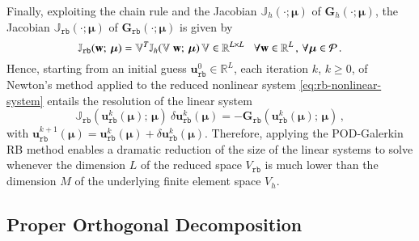 \documentclass{elsarticle}
\theoremstyle{theorem}
\theoremstyle{definition}
\theoremstyle{remark}
\theoremstyle{proposition}
\numberwithin{figure}{section}
\newcommand{\bg}[1]{\boldsymbol{#1}}
\begin{document}
		Finally, exploiting the chain rule and the Jacobian $\mathbb{J}_h(\cdot; \bg{\mu})$ of $\mathbf{G}_h(\cdot; \bg{\mu})$, the Jacobian $\mathbb{J}_{\texttt{rb}}(\cdot; \bg{\mu})$ of $\mathbf{G}_{\texttt{rb}}(\cdot; \bg{\mu})$ is given by
		\begin{equation}
			\label{eq:rb-nonlinear-system-jacobian}
			\mathbb{J}_{\texttt{rb}}(\mathbf{w}; \, \bg{\mu}) = \mathbb{V}^T \mathbb{J}_h(\mathbb{V} ~ \mathbf{w}; \, \bg{\mu}) \, \mathbb{V} \in \mathbb{R}^{L \times L} \hspace*{0.3cm} \forall \mathbf{w} \in \mathbb{R}^L \, , \, \forall \bg{\mu} \in \mathcal{P} \, .
		\end{equation}
		Hence, starting from an initial guess $\mathbf{u}_{\texttt{rb}}^0 \in \mathbb{R}^L$, each iteration $k$, $k \geq 0$, of Newton's method applied to the reduced nonlinear system \eqref{eq:rb-nonlinear-system} entails the resolution of the linear system
		\begin{equation}
			\label{eq:rb-nonlinear-system-newton}
			\mathbb{J}_{\texttt{rb}}(\mathbf{u}_{\texttt{rb}}^k(\bg{\mu}); \, \bg{\mu}) ~ \delta \mathbf{u}_{\texttt{rb}}^k(\bg{\mu}) = - \mathbf{G}_{\texttt{rb}}(\mathbf{u}_{\texttt{rb}}^k(\bg{\mu}); \, \bg{\mu}) \, ,
		\end{equation}
		with $\mathbf{u}_{\texttt{rb}}^{k+1}(\bg{\mu}) = \mathbf{u}_{\texttt{rb}}^k(\bg{\mu}) + \delta \mathbf{u}_{\texttt{rb}}^k(\bg{\mu})$. Therefore, applying the POD-Galerkin RB method enables a dramatic reduction of the size of the linear systems to solve whenever the dimension $L$ of the reduced space $V_{\texttt{rb}}$ is much lower than the dimension $M$ of the underlying finite element space $V_h$. 
		
		
	
		
	\subsection{Proper Orthogonal Decomposition}
	\label{section:Proper Orthogonal Decomposition} 
		
		
\end{document}

